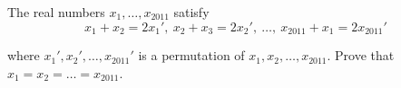 The real numbers $x_1,\ldots ,x_{2011}$ satisfy\[x_1+x_2=2x_1',\ x_2+x_3=2x_2', \ \ldots, \ x_{2011}+x_1=2x_{2011}'\]

where $x_1',x_2',\ldots,x_{2011}'$ is a permutation of $x_1,x_2,\ldots,x_{2011}$. Prove that $x_1=x_2=\ldots =x_{2011}$.